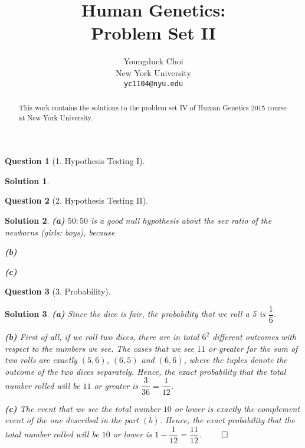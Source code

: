 \documentclass{article} %
\title{Human Genetics: \\
Problem Set II}
\author{
Youngduck Choi \\
New York University\\
\texttt{yc1104@nyu.edu} \\
}
\theoremstyle{quest}
\newtheorem*{question}{Question}
\newtheorem*{solution}{Solution}
\begin{document}
\maketitle

\begin{abstract}
This work contains the solutions to the problem set IV
of Human Genetics 2015 course at New York University.
\end{abstract}

\begin{question}[1. Hypothesis Testing I]
\end{question}
\begin{solution}

\end{solution}

\bigskip

\begin{question}[2. Hypothesis Testing II]
\end{question}
\begin{solution}
\textbf{(a)} $50:50$ is a good null hypothesis about the sex ratio of the newborns (girls: boys),
because 

\smallskip

\textbf{(b)} 

\smallskip

\textbf{(c)} 

\smallskip

\end{solution}

\bigskip

\begin{question}[3. Probability]
\end{question}
\begin{solution}
\textbf{(a)} Since the dice is fair, the probability that we roll a 5 is $\dfrac{1}{6}$.

\smallskip

\textbf{(b)} First of all, if we roll two dices, there are in total $6^2$ different 
outcomes with respect to the numbers we see. The cases that we see $11$ or greater for 
the sum of two rolls are exactly $(5,6)$, $(6,5)$ and $(6,6)$, where the tuples denote
the outcome of the two dices separately. Hence, the exact probability that the total
number rolled will be $11$ or greater is $\dfrac{3}{36} = \dfrac{1}{12}$. 

\smallskip

\textbf{(c)} The event that we see the total number $10$ or lower is exactly the complement event
of the one described in the part $(b)$. Hence, the exact probability that the total
number rolled will be $10$ or lower is $1 - \dfrac{1}{12} = \dfrac{11}{12}$. $\qed$

\end{solution}
\end{document}
